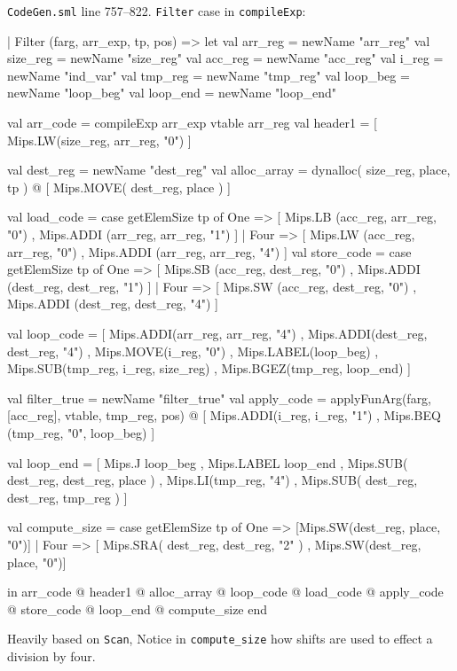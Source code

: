 \documentclass[12pt, a4paper]{article}
\begin{document}
\texttt{CodeGen.sml} line 757--822. \texttt{Filter} case in \texttt{compileExp}:
\begin{lstlistings}
    | Filter (farg, arr_exp, tp, pos) =>
        let val arr_reg  = newName "arr_reg"   
            val size_reg = newName "size_reg"  
            val acc_reg = newName "acc_reg"
            val i_reg    = newName "ind_var"   
            val tmp_reg  = newName "tmp_reg"   
            val loop_beg = newName "loop_beg"
            val loop_end = newName "loop_end"

            val arr_code = compileExp arr_exp vtable arr_reg
            val header1 = [ Mips.LW(size_reg, arr_reg, "0") ]

            val dest_reg = newName "dest_reg"
            val alloc_array = dynalloc( size_reg, place, tp )
                            @ [ Mips.MOVE( dest_reg, place ) ]

            val load_code =
                case getElemSize tp of
                    One =>  [ Mips.LB   (acc_reg, arr_reg, "0")
                            , Mips.ADDI (arr_reg, arr_reg, "1") ]
                  | Four => [ Mips.LW   (acc_reg, arr_reg, "0")
                            , Mips.ADDI (arr_reg, arr_reg, "4") ]
            val store_code =
                case getElemSize tp of
                    One =>  [ Mips.SB   (acc_reg, dest_reg, "0")
                            , Mips.ADDI (dest_reg, dest_reg, "1") ]
                  | Four => [ Mips.SW   (acc_reg, dest_reg, "0")
                            , Mips.ADDI (dest_reg, dest_reg, "4") ]
            
            val loop_code =
                [ Mips.ADDI(arr_reg, arr_reg, "4")
                , Mips.ADDI(dest_reg, dest_reg, "4")
                , Mips.MOVE(i_reg, "0")
                , Mips.LABEL(loop_beg)
                , Mips.SUB(tmp_reg, i_reg, size_reg)
                , Mips.BGEZ(tmp_reg, loop_end) ]
            
            val filter_true = newName "filter_true"
            val apply_code =
                applyFunArg(farg, [acc_reg], vtable, tmp_reg, pos) @
                [ Mips.ADDI(i_reg, i_reg, "1")
                , Mips.BEQ (tmp_reg, "0", loop_beg) ]

            val loop_end =
              [ Mips.J loop_beg
              , Mips.LABEL loop_end
              , Mips.SUB( dest_reg, dest_reg, place )
              , Mips.LI(tmp_reg, "4")
              , Mips.SUB( dest_reg, dest_reg, tmp_reg ) ]

            val compute_size =
              case getElemSize tp of
                    One => [Mips.SW(dest_reg, place, "0")]
                  | Four => [ Mips.SRA( dest_reg, dest_reg, "2" )
                            , Mips.SW(dest_reg, place, "0")]

        in arr_code
         @ header1
         @ alloc_array
         @ loop_code
         @ load_code
         @ apply_code
         @ store_code
         @ loop_end
         @ compute_size
        end
\end{lstlistings}
Heavily based on \texttt{Scan}, Notice in \verb+compute_size+ how shifts are used 
to effect a division by four.
\end{document}
